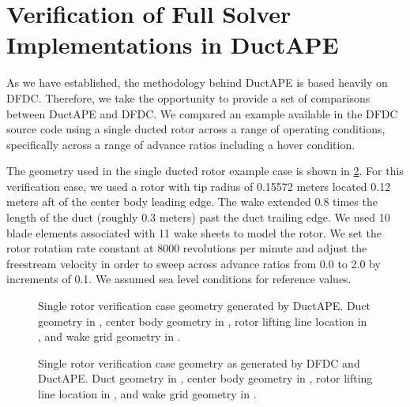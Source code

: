 
\section{Verification of Full Solver Implementations in DuctAPE}
\label{ssec:verification}

As we have established, the methodology behind DuctAPE is based heavily on DFDC.
%
Therefore, we take the opportunity to provide a set of comparisons between DuctAPE and DFDC.
%
We compared an example available in the DFDC source code using a single ducted rotor across a range of operating conditions, specifically across a range of advance ratios including a hover condition.

The geometry used in the single ducted rotor example case is shown in \cref{fig:singlerotorgeom}.
%
For this verification case, we used a rotor with tip radius of 0.15572 meters located 0.12 meters aft of the center body leading edge.
%
The wake extended 0.8 times the length of the duct (roughly 0.3 meters) past the duct trailing edge.
%
We used 10 blade elements associated with 11 wake sheets to model the rotor.
%
We set the rotor rotation rate constant at 8000 revolutions per minute and adjust the freestream velocity in order to sweep across advance ratios from 0.0 to 2.0 by increments of 0.1.
%
We assumed sea level conditions for reference values.

\begin{figure}[h!]
     \centering
     \hspace*{5em}
     \caption{Single rotor verification case geometry generated by DuctAPE. Duct geometry in , center body geometry in , rotor lifting line location in , and wake grid geometry in .}
    \label{fig:singlerotorgeom}
\end{figure}

\begin{figure}[h!]
     \centering
     \begin{subfigure}[t]{\textwidth}
         \centering
         \qquad
     \end{subfigure}

     \begin{subfigure}[t]{\textwidth}
         \centering
         \qquad
     \end{subfigure}
     \caption{Single rotor verification case geometry as generated by DFDC and DuctAPE. Duct geometry in , center body geometry in , rotor lifting line location in , and wake grid geometry in .}
    \label{fig:singlerotorgeom}
\end{figure}


